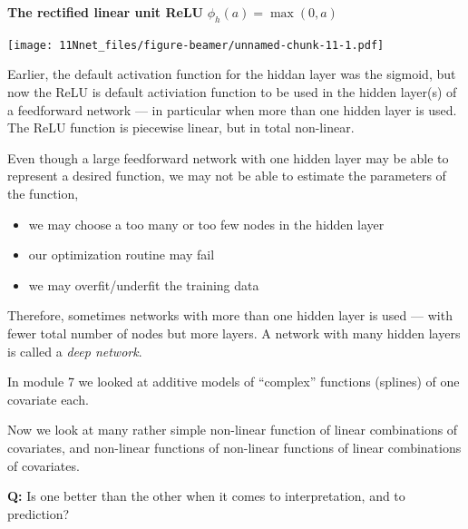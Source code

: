 \documentclass[10pt,ignorenonframetext,]{beamer}
\providecommand{\tightlist}{%
  \setlength{\itemsep}{0pt}\setlength{\parskip}{0pt}}
\begin{document}
\begin{frame}

\textbf{The rectified linear unit ReLU} \(\phi_h(a)=\max(0,a)\)

\texttt{[image: 11Nnet\_files/figure-beamer/unnamed-chunk-11-1.pdf]}

\end{frame}

\begin{frame}

Earlier, the default activation function for the hiddan layer was the
sigmoid, but now the ReLU is default activiation function to be used in
the hidden layer(s) of a feedforward network --- in particular when more
than one hidden layer is used. The ReLU function is piecewise linear,
but in total non-linear.

\end{frame}

\begin{frame}

Even though a large feedforward network with one hidden layer may be
able to represent a desired function, we may not be able to estimate the
parameters of the function,

\begin{itemize}
\tightlist
\item
  we may choose a too many or too few nodes in the hidden layer
\item
  our optimization routine may fail
\item
  we may overfit/underfit the training data
\end{itemize}

Therefore, sometimes networks with more than one hidden layer is used
--- with fewer total number of nodes but more layers. A network with
many hidden layers is called a \emph{deep network}.

\end{frame}

\begin{frame}

In module 7 we looked at additive models of ``complex'' functions
(splines) of one covariate each.

Now we look at many rather simple non-linear function of linear
combinations of covariates, and non-linear functions of non-linear
functions of linear combinations of covariates.

\textbf{Q:} Is one better than the other when it comes to
interpretation, and to prediction?

\end{frame}
\end{document}
